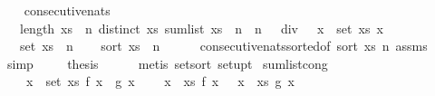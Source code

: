 \begin{isabellebody}
%
\endisatagproof
{\isafoldproof}%
%
\isadelimproof
\isanewline
%
\endisadelimproof
\ \ \isanewline
{}\isamarkupfalse%
\ consecutive{\isacharunderscore}nats{\isacharcolon}\isanewline
\ \ \ {\isachardoublequoteopen}length\ xs\ {\isacharequal}\ n{\isachardoublequoteclose}\ {\isachardoublequoteopen}distinct\ xs{\isachardoublequoteclose}\ {\isachardoublequoteopen}sum{\isacharunderscore}list\ xs\ {\isasymle}\ n\ {\isacharasterisk}\ {\isacharparenleft}n\ {\isacharplus}\ {}{\isacharparenright}\ div\ {}{\isachardoublequoteclose}\ {\isachardoublequoteopen}{\isasymforall}\ x\ {\isasymin}\ set\ xs{\isachardot}\ x\ {\isachargreater}\ {}{\isachardoublequoteclose}\isanewline
\ \ \ {\isachardoublequoteopen}set\ xs\ {\isacharequal}\ {\isacharbraceleft}{}{\isachardot}{\isachardot}{\isacharless}n{\isacharplus}{}{\isacharbraceright}{\isachardoublequoteclose}\isanewline
%
\isadelimproof
%
\endisadelimproof
%
\isatagproof
{}\isamarkupfalse%
{\isacharminus}\isanewline
\ \ \isamarkupfalse%
\ {\isachardoublequoteopen}sort\ xs\ {\isacharequal}\ {\isacharbrackleft}{}{\isachardot}{\isachardot}{\isacharless}n{\isacharplus}{}{\isacharbrackright}{\isachardoublequoteclose}\isanewline
\ \ \ \ \isamarkupfalse%
\ consecutive{\isacharunderscore}nats{\isacharunderscore}sorted{\isacharbrackleft}of\ {\isachardoublequoteopen}sort\ xs{\isachardoublequoteclose}\ n{\isacharbrackright}\ assms\isanewline
\ \ \ \ \isamarkupfalse%
\ simp\ \isanewline
\ \ \isamarkupfalse%
\ {\isacharquery}thesis\isanewline
\ \ \ \ \isamarkupfalse%
\ {\isacharparenleft}metis\ set{\isacharunderscore}sort\ set{\isacharunderscore}upt{\isacharparenright}\isanewline
{}\isamarkupfalse%
%
\endisatagproof
{\isafoldproof}%
%
\isadelimproof
\isanewline
%
\endisadelimproof
\isanewline
{}\isamarkupfalse%
\ sum{\isacharunderscore}list{\isacharunderscore}cong{\isacharcolon}\isanewline
\ \ \ {\isachardoublequoteopen}{\isasymforall}\ x\ {\isasymin}\ set\ xs{\isachardot}\ f\ x\ {\isacharequal}\ g\ x{\isachardoublequoteclose}\isanewline
\ \ \ {\isachardoublequoteopen}{\isacharparenleft}{\isasymSum}\ x\ {\isasymleftarrow}\ xs{\isachardot}\ f\ x{\isacharparenright}\ {\isacharequal}\ {\isacharparenleft}{\isasymSum}\ x\ {\isasymleftarrow}\ xs{\isachardot}\ g\ x{\isacharparenright}{\isachardoublequoteclose}\isanewline
%
\isadelimproof
\ \ %
\endisadelimproof

\end{isabellebody}
